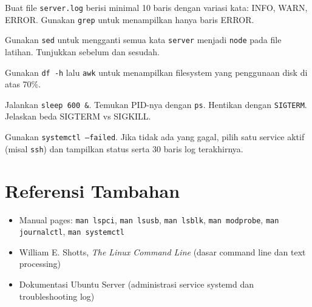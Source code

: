 \begin{exercisebox}[2.C]
Buat file \texttt{server.log} berisi minimal 10 baris dengan variasi kata: INFO, WARN, ERROR. Gunakan \texttt{grep} untuk menampilkan hanya baris ERROR.
\end{exercisebox}

\begin{exercisebox}[2.D]
Gunakan \texttt{sed} untuk mengganti semua kata \texttt{server} menjadi \texttt{node} pada file latihan. Tunjukkan sebelum dan sesudah.
\end{exercisebox}

\begin{exercisebox}[2.E]
Gunakan \texttt{df -h} lalu \texttt{awk} untuk menampilkan filesystem yang penggunaan disk di atas 70\%.
\end{exercisebox}

\begin{exercisebox}[2.F]
Jalankan \texttt{sleep 600 \&}. Temukan PID-nya dengan \texttt{ps}. Hentikan dengan \texttt{SIGTERM}. Jelaskan beda SIGTERM vs SIGKILL.
\end{exercisebox}

\begin{exercisebox}[2.G]
Gunakan \texttt{systemctl --failed}. Jika tidak ada yang gagal, pilih satu service aktif (misal \texttt{ssh}) dan tampilkan status serta 30 baris log terakhirnya.
\end{exercisebox}

\section{Referensi Tambahan}

\begin{itemize}
    \item Manual pages: \texttt{man lspci}, \texttt{man lsusb}, \texttt{man lsblk}, \texttt{man modprobe}, \texttt{man journalctl}, \texttt{man systemctl}
    \item William E. Shotts, \textit{The Linux Command Line} (dasar command line dan text processing)
    \item Dokumentasi Ubuntu Server (administrasi service systemd dan troubleshooting log)
\end{itemize}

